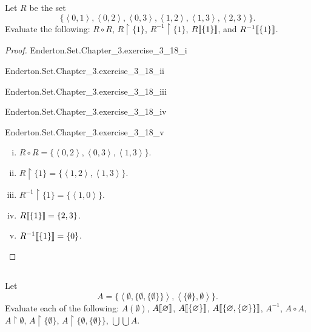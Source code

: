 \documentclass{report}
\begin{document}
\subsection{}%
\label{sub:exercise-3.18}

Let $R$ be the set
  $$\{ \left< 0, 1 \right>, \left< 0, 2 \right>, \left< 0, 3 \right>,
       \left< 1, 2 \right>, \left< 1, 3 \right>, \left< 2, 3 \right>\}.$$
Evaluate the following: $R \circ R$, $R \restriction \{1\}$,
  $R^{-1} \restriction \{1\}$, $R\!\left\llbracket\{1\}\right\rrbracket$, and $R^{-1}\!\left\llbracket\{1\}\right\rrbracket$.

\begin{proof}

  \statementpadding

    {Enderton.Set.Chapter\_3.exercise\_3\_18\_i}

    {Enderton.Set.Chapter\_3.exercise\_3\_18\_ii}

    {Enderton.Set.Chapter\_3.exercise\_3\_18\_iii}

    {Enderton.Set.Chapter\_3.exercise\_3\_18\_iv}

    {Enderton.Set.Chapter\_3.exercise\_3\_18\_v}

  \begin{enumerate}[(i)]
    \item $R \circ R = \{
      \left< 0, 2 \right>,
      \left< 0, 3 \right>,
      \left< 1, 3 \right>
    \}$.
    \item $R \restriction \{1\} = \{
      \left< 1, 2 \right>,
      \left< 1, 3 \right>
    \}$.
    \item $R^{-1} \restriction \{1\} = \{\left< 1, 0 \right>\}$.
    \item $R\!\left\llbracket\{1\}\right\rrbracket = \{2, 3\}$.
    \item $R^{-1}\!\left\llbracket\{1\}\right\rrbracket = \{0\}$.
  \end{enumerate}

\end{proof}

\subsection{}%
\label{sub:exercise-3.19}

Let $$A = \{
  \left< \emptyset, \{\emptyset, \{\emptyset\}\} \right>,
  \left< \{\emptyset\}, \emptyset \right>
  \}.$$
Evaluate each of the following: $A(\emptyset)$, $A\!\left\llbracket\varnothing\right\rrbracket$,
  $A\!\left\llbracket\{\varnothing\}\right\rrbracket$, $A\!\left\llbracket\{\varnothing, \{\varnothing\}\}\right\rrbracket$,
  $A^{-1}$, $A \circ A$, $A \restriction \emptyset$,
  $A \restriction \{\emptyset\}$, $A \restriction \{\emptyset, \{\emptyset\}\}$,
  $\bigcup\bigcup A$.
\end{document}
